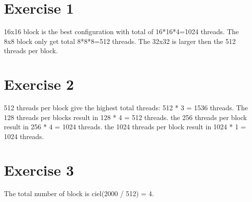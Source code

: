 \documentclass{article}
\begin{document}
\section{Exercise 1}
16x16 block is the best configuration with total of 16*16*4=1024 threads. The 8x8 block only get total 8*8*8=512 threads. The 32x32 is larger then the 512 threads per block.

\section{Exercise 2}
512 threads per block give the highest total threads: 512 * 3 = 1536 threads. The 128 threads per blocks result in 128 * 4 = 512 threads. the 256 threads per block result in 256 * 4 = 1024 threads. the 1024 threads per block result in 1024 * 1 = 1024 threads.

\section{Exercise 3}
The total number of block is ciel(2000 / 512) = 4.
\end{document}
